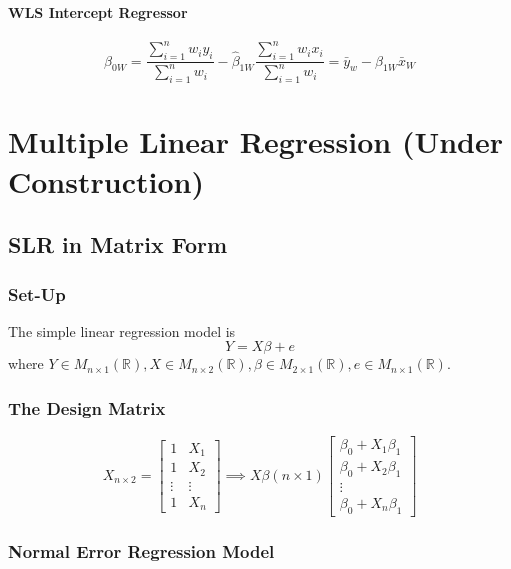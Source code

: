 \documentclass[10pt]{article}
\newcommand{\R}{\mathbb{R}}
\newcommand{\mat}[2]{M_{#1 \times #2}(\R)}
\begin{document}
\paragraph{WLS Intercept Regressor}
\begin{equation}
    \hat{\beta}_{0 W}=\frac{\sum_{i=1}^{n} w_{i} y_{i}}{\sum_{i=1}^{n} w_{i}}-\hat{\beta}_{1 W} \frac{\sum_{i=1}^{n} w_{i} x_{i}}{\sum_{i=1}^{n} w_{i}} = \bar{y}_{w}-\hat{\beta}_{1 W} \bar{x}_{W}
\end{equation}

\section{Multiple Linear Regression (Under Construction)}
\subsection{SLR in Matrix Form}
\subsubsection{Set-Up}
The simple linear regression model is
\begin{equation*}
    Y = X\beta + e
\end{equation*}
where $Y \in \mat{n}{1}, X\in \mat{n}{2}, \beta\in \mat{2}{1}, e\in \mat{n}{1}$.
\subsubsection{The Design Matrix}
\begin{equation*}
    X_{n\times 2} = \begin{bmatrix}
        1 & X_1 \\
        1 & X_2 \\
        \vdots & \vdots \\
        1 & X_n
    \end{bmatrix}
    \implies
    X\beta (n\times 1)
    \begin{bmatrix}
        \beta_0 + X_1 \beta_1 \\
        \beta_0 + X_2 \beta_1 \\
        \vdots \\
        \beta_0 + X_n \beta_1
    \end{bmatrix}
\end{equation*}

\subsubsection{Normal Error Regression Model}
\end{document}
